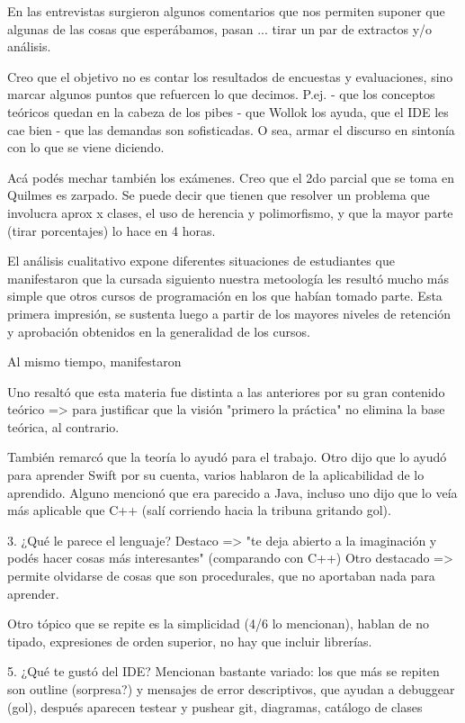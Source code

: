 En las entrevistas surgieron algunos comentarios que nos permiten suponer que algunas de las cosas que esperábamos, pasan ... tirar un par de extractos y/o análisis. 

Creo que el objetivo no es contar los resultados de encuestas y evaluaciones, sino marcar algunos puntos que refuercen lo que decimos. P.ej. 
- que los conceptos teóricos quedan en la cabeza de los pibes
- que Wollok los ayuda, que el IDE les cae bien
- que las demandas son sofisticadas.
O sea, armar el discurso en sintonía con lo que se viene diciendo.

Acá podés mechar también los exámenes. Creo que el 2do parcial que se toma en Quilmes es zarpado. Se puede decir que tienen que resolver un problema que involucra aprox x clases, el uso de herencia y polimorfismo, y que la mayor parte (tirar porcentajes) lo hace en 4 horas. 

El análisis cualitativo expone diferentes situaciones de estudiantes que manifestaron que la cursada siguiento nuestra metoología les resultó mucho más simple que otros cursos de programación en los que habían tomado parte. Esta primera impresión, se sustenta luego a partir de los mayores niveles de retención y aprobación obtenidos en la generalidad de los cursos. 

Al mismo tiempo, manifestaron 

Uno resaltó que esta materia fue distinta a las anteriores por su gran contenido teórico => para justificar que la visión "primero la práctica" no elimina la base teórica, al contrario.

También remarcó que la teoría lo ayudó para el trabajo. Otro dijo que lo ayudó para aprender Swift por su cuenta, varios hablaron de la aplicabilidad de lo aprendido. Alguno mencionó que era parecido a Java, incluso uno dijo que lo veía más aplicable que C++ (salí corriendo hacia la tribuna gritando gol).

3. ¿Qué le parece el lenguaje?
Destaco => "te deja abierto a la imaginación y podés hacer cosas más interesantes" (comparando con C++)
Otro destacado => permite olvidarse de cosas que son procedurales, que no aportaban nada para aprender. 

Otro tópico que se repite es la simplicidad (4/6 lo mencionan), hablan de no tipado, expresiones de orden superior, no hay que incluir librerías.

5. ¿Qué te gustó del IDE?
Mencionan bastante variado: los que más se repiten son outline (sorpresa?) y mensajes de error descriptivos, que ayudan a debuggear (gol), después aparecen testear y pushear git, diagramas, catálogo de clases


